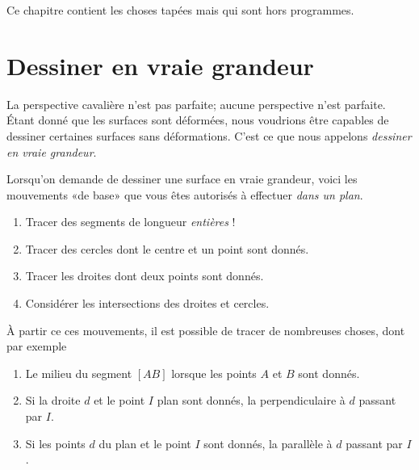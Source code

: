 
Ce chapitre contient les choses tapées mais qui sont hors programmes.

\section{Dessiner en vraie grandeur}

La perspective cavalière n'est pas parfaite; aucune perspective n'est parfaite. Étant donné que les surfaces sont déformées, nous voudrions être capables de dessiner certaines surfaces sans déformations. C'est ce que nous appelons \emph{dessiner en vraie grandeur}.

\begin{Aretenir}
    Lorsqu'on demande de dessiner une surface en vraie grandeur, voici les mouvements «de base» que vous êtes autorisés à effectuer \emph{dans un plan}.
    \begin{enumerate}
        \item
            Tracer des segments de longueur \emph{entières} !
        \item
            Tracer des cercles dont le centre et un point sont donnés.
        \item
            Tracer les droites dont deux points sont donnés.
        \item
            Considérer les intersections des droites et cercles.
    \end{enumerate}
    À partir ce ces mouvements, il est possible de tracer de nombreuses choses, dont par exemple
    \begin{enumerate}
        \item
            Le milieu du segment \( [AB]\) lorsque les points \( A\) et \( B\) sont donnés.
        \item
            Si la droite \( d\) et le point \( I\) plan sont donnés, la perpendiculaire à \( d\) passant par \( I\).
        \item
            Si les points \( d\) du plan et le point \( I\) sont donnés, la parallèle à \( d\) passant par \( I\).
    \end{enumerate}
\end{Aretenir}

